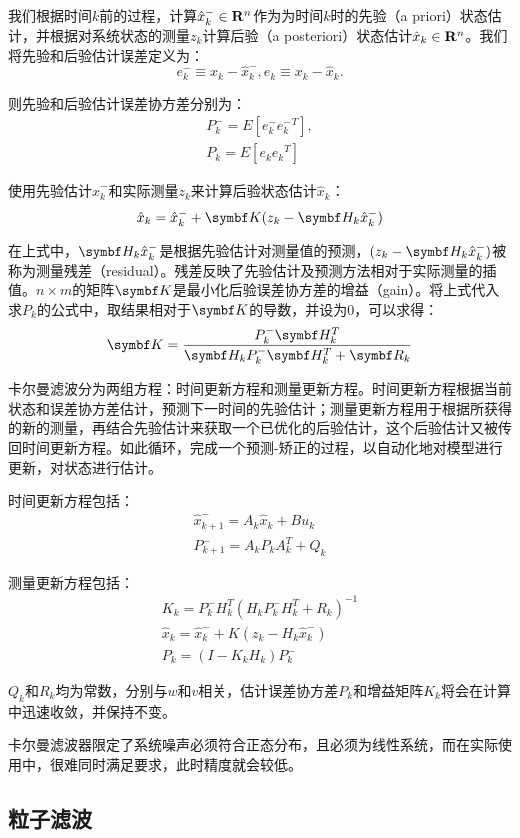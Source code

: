   我们根据时间$k$前的过程，计算$\hat{x}^{-}_k \in \mathbf{R}^n$作为为时间$k$时的先验（a priori）状态估计，并根据对系统状态的测量$z_k$计算后验（a posteriori）状态估计$\hat{x}_k \in \mathbf{R}^n$。我们将先验和后验估计误差定义为：
$$e^{-}_k \equiv x_k -\hat{x}^{-}_k, e_k \equiv x_k - \hat{x}_k. $$

  则先验和后验估计误差协方差分别为：
\begin{gather*}
P^{-}_k = E[e^{-}_k {e^{-}_k}^T],\\
P_k=E[e_k {e_k}^T]
\end{gather*}

  使用先验估计$\hat{x}^{-}_k$和实际测量$z_k$来计算后验状态估计$\hat{x}_k$：
$$\hat{x}_k = \hat{x}^{-}_k + \mat{K} (z_k - \mat{H}_k \hat{x}^{-}_k)$$

  在上式中，$\mat{H}_k \hat{x}^{-}_k$是根据先验估计对测量值的预测，$(z_k - \mat{H}_k \hat{x}^{-}_k)$被称为测量残差（residual）。残差反映了先验估计及预测方法相对于实际测量的插值。$n\times m$的矩阵$\mat{K}$是最小化后验误差协方差的增益（gain）。将上式代入求$P_k$的公式中，取结果相对于$\mat{K}$的导数，并设为0，可以求得：
$$\mat{K}=\frac{P^{-}_k \mat{H}^T_k}{\mat{H}_k P^{-}_k \mat{H}^T_k + \mat{R}_k}$$

  卡尔曼滤波分为两组方程：时间更新方程和测量更新方程。时间更新方程根据当前状态和误差协方差估计，预测下一时间的先验估计；测量更新方程用于根据所获得的新的测量，再结合先验估计来获取一个已优化的后验估计，这个后验估计又被传回时间更新方程。如此循环，完成一个预测-矫正的过程，以自动化地对模型进行更新，对状态进行估计。

  时间更新方程包括：
\begin{gather*}
\hat{x}^{-}_{k+1}=A_k \hat{x}_k + B u_k \\
P^{-}_{k+1}=A_k P_k A^T_k + Q_k
\end{gather*}

  测量更新方程包括：
\begin{gather*}
K_k=P^{-}_k H^T_k(H_k P^{-}_k H^T_k + R_k)^{-1} \\
\hat{x}_k = \hat{x}^{-}_k + K (z_k - H_k \hat{x}^{-}_k) \\
P_k = (I-K_k H_k)P^{-}_k
\end{gather*}

  $Q_k$和$R_k$均为常数，分别与$w$和$v$相关，估计误差协方差$P_k$和增益矩阵$K_k$将会在计算中迅速收敛，并保持不变。

  卡尔曼滤波器限定了系统噪声必须符合正态分布，且必须为线性系统，而在实际使用中，很难同时满足要求，此时精度就会较低。

\subsection{粒子滤波}

